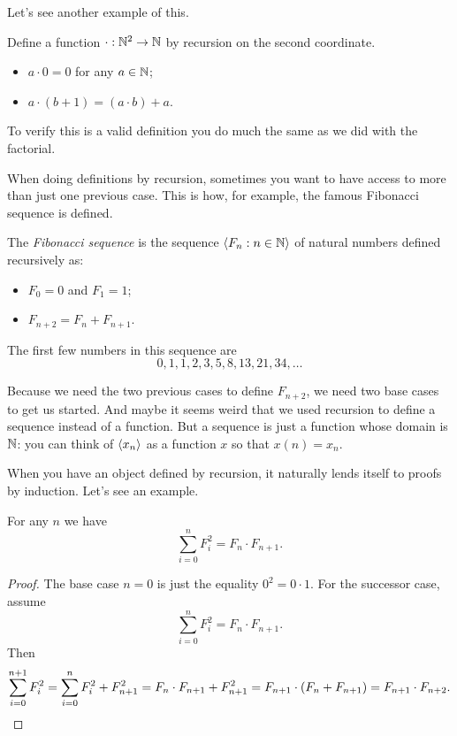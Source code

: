 \documentclass[10pt]{amsart}
\begin{document}
Let's see another example of this.

\begin{example}
Define a function $\mathord{\cdot} : \mathbb{N}^2 \to \mathbb{N}$ by recursion on the second coordinate.
\begin{itemize}
\item $a \cdot 0 = 0$ for any $a \in \mathbb{N}$;
\item $a \cdot (b+1) = (a\cdot b) + a$.
\end{itemize}
\end{example}

To verify this is a valid definition you do much the same as we did with the factorial.

When doing definitions by recursion, sometimes you want to have access to more than just one previous case. This is how, for example, the famous Fibonacci sequence is defined.

\begin{example}
The \emph{Fibonacci sequence} is the sequence ${\left\langle F_n : n \in \mathbb{N} \right\rangle}$ of natural numbers defined recursively as:
\begin{itemize}
\item $F_0 = 0$ and $F_1 = 1$;
\item $F_{n+2} = F_n + F_{n+1}$.
\end{itemize}
The first few numbers in this sequence are
\[
0, 1, 1, 2, 3, 5, 8, 13, 21, 34, \ldots
\]
\end{example}

Because we need the two previous cases to define $F_{n+2}$, we need two base cases to get us started. And maybe it seems weird that we used recursion to define a sequence instead of a function. But a sequence is just a function whose domain is $\mathbb{N}$: you can think of ${\left\langle x_n \right\rangle}$ as a function $x$ so that $x(n) = x_n$.

When you have an object defined by recursion, it naturally lends itself to proofs by induction. Let's see an example.

\begin{proposition}
For any $n$ we have
\[
\sum_{i=0}^n F_i^2 = F_n \cdot F_{n+1}.
\]
\end{proposition}

\begin{proof}
The base case $n=0$ is just the equality $0^2 = 0\cdot 1$. For the successor case, assume 
\[
\sum_{i=0}^n F_i^2 = F_n \cdot F_{n+1}.
\]
Then
\[
\sum_{i=0}^{n+1} F_i^2 = \sum_{i=0}^n F_i^2 + F_{n+1}^2 = F_n \cdot F_{n+1} + F_{n+1}^2 = F_{n+1} \cdot (F_n + F_{n+1}) = F_{n+1} \cdot F_{n+2}. \qedhere
\]
\end{proof}
\end{document}
